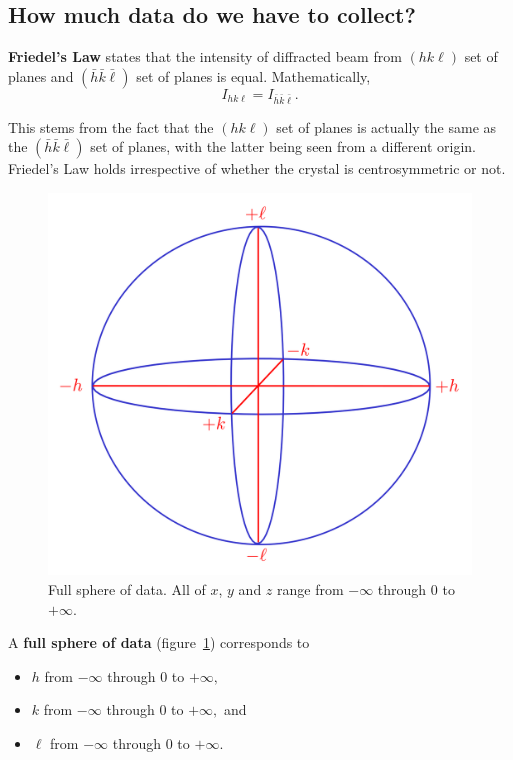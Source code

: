 \subsection{How much data do we have to collect?}

\textbf{Friedel's Law} states that the intensity of diffracted beam from $(hk\ell)$ set of planes and $(\bar{h} \bar{k} \bar{\ell})$ set of planes is equal. Mathematically,%
%	
	\begin{equation}
	I_{hk\ell} = I_{\bar{h} \bar{k} \bar{\ell}}.
	\end{equation}
	
This stems from the fact that the $(hk\ell)$ set of planes is actually the same as the $(\bar{h} \bar{k} \bar{\ell})$ set of planes, with the latter being seen from a different origin. Friedel's Law holds irrespective of whether the crystal is centrosymmetric or not.

\begin{figure}
	\centering
	\includegraphics[scale=0.15]{full_sphere.png}
	\caption{\label{fig:full_sphere}Full sphere of data. All of $x$, $y$ and $z$ range from $-\infty$ through $0$ to $+\infty.$}
\end{figure}

A \textbf{full sphere of data} (figure~\ref{fig:full_sphere}) corresponds to%
%	
	\begin{itemize}%
%	
	    \item $h$ from $-\infty$ through $0$ to $+\infty,$
	    
	    \item $k$ from $-\infty$ through $0$ to $+\infty,$ and
	    
	    \item $\ell$ from $-\infty$ through $0$ to $+\infty.$
	    
	\end{itemize}
	
